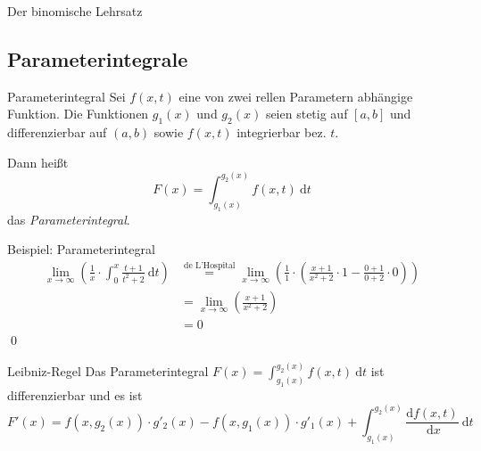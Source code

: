\documentclass[german]{spicker}
\newcommand{\dx}{~\mathrm{d}x}
\newcommand{\dt}{~\mathrm{d}t}
\begin{document}
\begin{defi}{Der binomische Lehrsatz}
\subsection{Parameterintegrale}

\begin{defi}{Parameterintegral}
    Sei $f(x, t)$ eine von zwei rellen Parametern abhängige Funktion.
    Die Funktionen $g_1(x)$ und $g_2(x)$ seien stetig auf $[a, b]$ und differenzierbar auf $(a, b)$ sowie $f(x, t)$ integrierbar bez. $t$.

    Dann heißt
    $$
        F(x) = \int^{g_2(x)}_{g_1(x)} f(x, t) \dt
    $$
    das \emph{Parameterintegral}.
\end{defi}

\begin{bonus}{Beispiel: Parameterintegral}
    $$
        \begin{aligned}
            \lim_{x\to\infty} \left( \frac{1}{x} \cdot \int_0^x \frac{t+1}{t^2 + 2} \dt\right)
             & \overset{\text{de L'Hospital}}={} \lim_{x\to\infty} \left( \frac{1}{1} \cdot \left( \frac{x+1}{x^2 + 2} \cdot 1 - \frac{0+1}{0+2} \cdot 0 \right)\right) \\
             & ={} \lim_{x\to\infty} \left( \frac{x+1}{x^2 + 2} \right)                                                                                                 \\
             & ={} 0
        \end{aligned}
    $$\qed
\end{bonus}

\begin{defi}{Leibniz-Regel}
    Das Parameterintegral $F(x) = \int^{g_2(x)}_{g_1(x)} f(x, t) \dt$ ist differenzierbar und es ist
    $$
        F'(x) = f(x, g_2(x)) \cdot g'_2(x) - f(x, g_1(x)) \cdot g'_1(x) + \int^{g_2(x)}_{g_1(x)} \frac{\mathrm{d} f(x, t)}{\dx}\dt
    $$
\end{defi}


\end{defi}
\end{document}
